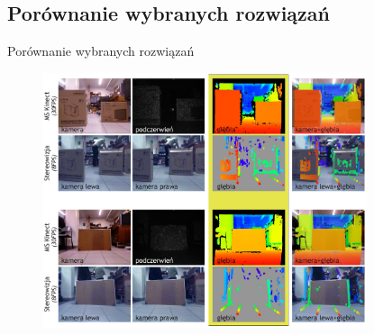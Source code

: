 \documentclass[xcolor=x11names,compress]{beamer}
\renewcommand{\(}{\begin{columns}}
\renewcommand{\)}{\end{columns}}
\newcommand{\<}[1]{\begin{column}{#1}}
\renewcommand{\>}{\end{column}}
\begin{document}






\subsection{Porównanie wybranych rozwiązań}

\begin{frame}{Porównanie wybranych rozwiązań}

\begin{figure}[h!]
\centering
\includegraphics[width=9.5cm]{../Common/img/compare}
\end{figure}

\end{frame}
\end{document}
